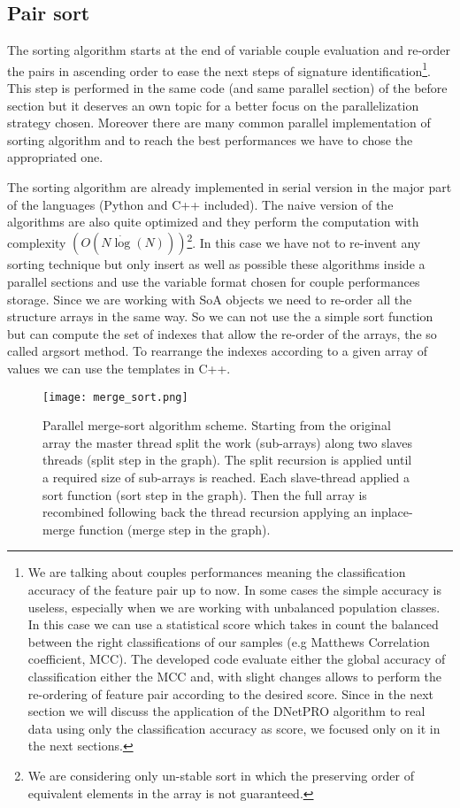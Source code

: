 \documentclass{standalone}
\begin{document}
\subsection[Sorting]{Pair sort}\label{implementation:sort}

The sorting algorithm starts at the end of variable couple evaluation and re-order the pairs in ascending order to ease the next steps of signature identification\footnote{
  We are talking about couples performances meaning the classification accuracy of the feature pair up to now.
  In some cases the simple accuracy is useless, especially when we are working with unbalanced population classes.
  In this case we can use a statistical score which takes in count the balanced between the right classifications of our samples (e.g Matthews Correlation coefficient, MCC).
  The developed code evaluate either the global accuracy of classification either the MCC and, with slight changes allows to perform the re-ordering of feature pair according to the desired score.
  Since in the next section we will discuss the application of the DNetPRO algorithm to real data using only the classification accuracy as score, we focused only on it in the next sections.
}.
This step is performed in the same code (and same parallel section) of the before section but it deserves an own topic for a better focus on the parallelization strategy chosen.
Moreover there are many common parallel implementation of sorting algorithm and to reach the best performances we have to chose the appropriated one.

The sorting algorithm are already implemented in serial version in the major part of the languages (Python and C++ included).
The naive version of the algorithms are also quite optimized and they perform the computation with complexity $(O(N\dot\log(N)))$\footnote{
  We are considering only un-stable sort in which the preserving order of equivalent elements in the array is not guaranteed.
}.
In this case we have not to re-invent any sorting technique but only insert as well as possible these algorithms inside a parallel sections and use the variable format chosen for couple performances storage.
Since we are working with SoA objects we need to re-order all the structure arrays in the same way.
So we can not use the a simple sort function but can compute the set of indexes that allow the re-order of the arrays, the so called \textsf{argsort} method.
To rearrange the indexes according to a given array of values we can use the templates in C++.

\begin{figure}[htbp]
\centering
\texttt{[image: merge\_sort.png]}
\caption{Parallel merge-sort algorithm scheme.
Starting from the original array the master thread split the work (sub-arrays) along two slaves threads (\textsf{split} step in the graph).
The split recursion is applied until a required size of sub-arrays is reached.
Each slave-thread applied a sort function (\textsf{sort} step in the graph).
Then the full array is recombined following back the thread recursion applying an \textsf{inplace-merge} function (\textsf{merge} step in the graph).
}
\label{fig:merge_sort}
\end{figure}
\end{document}
